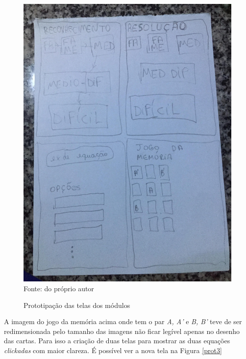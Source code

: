 \begin{figure}[H]
\centering
\caption{Prototipação das telas dos módulos}
\includegraphics[scale=0.13]{figuras/prot2.jpg}
\label{prot2}
\\
\small{Fonte: do próprio autor}
\end{figure}

A imagem do jogo da memória acima onde tem o par \textit{A, A'} e \textit{B, B'} teve de ser redimensionada pelo tamanho das imagens não ficar legível apenas no desenho das cartas. Para isso a criação de duas telas para mostrar as duas equações \textit{clickadas} com maior clareza. É possível ver a nova tela na Figura \ref{prot3}

